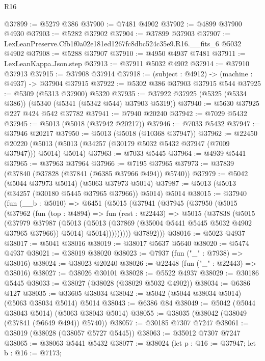 \begin{lexlean}{R16}
\begin{coremodule}
@37899 := @5279 @386
@37900 := @7481 @4902
@37902 := @4899 @37900 @4930
@37903 := @5282 @37902
@37904 := @37899 @37903
@37907 := LexLeanPreserve.Cfb1f0a02e181ed1267fc8dbc524c35e9.R16.__fits_6 @5032 @4902
@37908 := @5288 @37907
@37910 := @4950 @4937 @7481
@37911 := LexLeanKappa.Json.step
@37913 := @37911 @5032 @4902
@37914 := @37910 @37913
@37915 := @37908 @37914
@37918 := (subject : @4912) -> (machine : @4937) -> @37904 @37915
@37922 := @5302 @386 @37903 @37915 @544
@37925 := @5309 (@5313 @37900) @5320
@37935 := @37922 @37925 (@5325 (@5334 @386)) (@5340 (@5341 (@5342 @544) @37903 @5319))
@37940 := @5630 @37925 @227 @424 @542 @37782
@37941 := @7940 @20240
@37942 := @7029 @5432
@37945 := @5013 (@5018 (@37942 @20217))
@37946 := @7033 @5432
@37947 := @37946 @20217
@37950 := @5013 (@5018 (@10368 @37947))
@37962 := @22450
    @20220
    (@5013 (@5013 (@34257 (@30179 @5032 @5432 @37947 (@7009 @37947))) @5014) @5014)
@37963 := @7033 @5445
@37964 := @4939 @5441
@37965 := @37963 @37964
@37966 := @7195 @37965
@37973 := @37839 (@37840 (@37828 (@37841 (@6385 @37966 @494)) @5740))
@37979 := @5042 (@5044 @37973 @5014) (@5063 @37973 @5014)
@37987 := @5013 (@5013 (@34257 (@30180 @5445 @37965 @37966)) @5014) @5014
@38015 := @37940
    (fun (__b : @5010) =>
    @6451
      (@5015
        (@37941
          (@37945
            (@37950
              (@5015
                (@37962
                  (fun (top : @4894) =>
                  fun (rest : @22443) =>
                  @5015
                    (@37838
                      (@5015
                        (@37979
                          @37987
                          (@5013
                            (@5013 (@37869 (@35004 @5441 @5445 @5032 @4902 @37965 @37966)) @5014)
                            @5014)))))))))
          @37892)))
@38016 := @5023 @4937
@38017 := @5041 @38016
@38019 := @38017 @5637 @5640
@38020 := @5474 @4937
@38021 := @38019 @38020
@38023 := @7937 (fun ("_" : @7938) => @38016)
@38024 := @38023 @20240
@38026 := @22448 (fun ("_" : @22443) => @38016)
@38027 := @38026 @30101
@38028 := @5522 @4937
@38029 := @30186 @5445
@38033 := @38027 (@38028 (@38029 @5032 @4902))
@38034 := @6386 @127
@38035 := @33605 @38034
@38042 := @5042 (@5044 @38034 @5014) (@5063 @38034 @5014) @5014
@38043 := @6386 @84
@38049 := @5042 (@5044 @38043 @5014) (@5063 @38043 @5014)
@38055 := @38035 (@38042 (@38049 (@37841 (@6649 @494)) @5740))
@38057 := @30185 @7307 @7247
@38061 := @38019 (@38028 (@38057 @5727 @5445))
@38063 := @35012 @7307 @7247
@38065 := @38063 @5441 @5432
@38077 := @38024
    (let p : @16 := @37947;
    let b : @16 := @7173;

\end{coremodule}
\end{lexlean}
